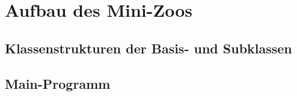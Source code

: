 
\chapter{Aufbau des Mini-Zoos}

\section{Klassenstrukturen der Basis- und Subklassen}

\section{Main-Programm}

